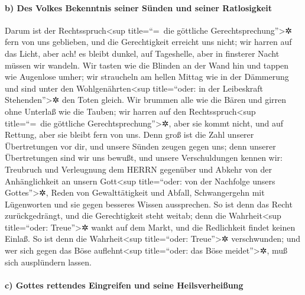 \hypertarget{b-des-volkes-bekenntnis-seiner-suxfcnden-und-seiner-ratlosigkeit}{%
\paragraph{b) Des Volkes Bekenntnis seiner Sünden und seiner
Ratlosigkeit}\label{b-des-volkes-bekenntnis-seiner-suxfcnden-und-seiner-ratlosigkeit}}

Darum ist der Rechtsspruch\textless sup title=``=~die
göttliche Gerechtsprechung''\textgreater✲ fern von uns geblieben, und
die Gerechtigkeit erreicht uns nicht; wir harren auf das Licht, aber
ach! es bleibt dunkel, auf Tageshelle, aber in finsterer Nacht müssen
wir wandeln. Wir tasten wie die Blinden an der Wand hin
und tappen wie Augenlose umher; wir straucheln am hellen Mittag wie in
der Dämmerung und sind unter den Wohlgenährten\textless sup
title=``oder: in der Leibeskraft Stehenden''\textgreater✲ den Toten
gleich. Wir brummen alle wie die Bären und girren ohne
Unterlaß wie die Tauben; wir harren auf den Rechtsspruch\textless sup
title=``=~die göttliche Gerechtsprechung''\textgreater✲, aber sie kommt
nicht, und auf Rettung, aber sie bleibt fern von uns.
Denn groß ist die Zahl unserer Übertretungen vor dir, und
unsere Sünden zeugen gegen uns; denn unserer Übertretungen sind wir uns
bewußt, und unsere Verschuldungen kennen wir: Treubruch
und Verleugnung dem HERRN gegenüber und Abkehr von der Anhänglichkeit an
unsern Gott\textless sup title=``oder: von der Nachfolge unsers
Gottes''\textgreater✲, Reden von Gewalttätigkeit und Abfall,
Schwangergehn mit Lügenworten und sie gegen besseres Wissen aussprechen.
So ist denn das Recht zurückgedrängt, und die
Gerechtigkeit steht weitab; denn die Wahrheit\textless sup title=``oder:
Treue''\textgreater✲ wankt auf dem Markt, und die Redlichkeit findet
keinen Einlaß. So ist denn die Wahrheit\textless sup
title=``oder: Treue''\textgreater✲ verschwunden; und wer sich gegen das
Böse auflehnt\textless sup title=``oder: das Böse meidet''\textgreater✲,
muß sich ausplündern lassen.

\hypertarget{c-gottes-rettendes-eingreifen-und-seine-heilsverheiuxdfung}{%
\paragraph{c) Gottes rettendes Eingreifen und seine
Heilsverheißung}\label{c-gottes-rettendes-eingreifen-und-seine-heilsverheiuxdfung}}

